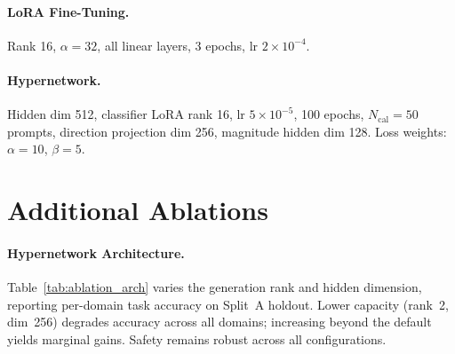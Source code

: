 \documentclass[11pt]{article}
\begin{document}
\paragraph{LoRA Fine-Tuning.} Rank 16, $\alpha{=}32$, all linear layers, 3 epochs, lr $2{\times}10^{-4}$.

\paragraph{Hypernetwork.} Hidden dim 512, classifier LoRA rank 16, lr $5{\times}10^{-5}$, 100 epochs, $N_\text{cal}{=}50$ prompts, direction projection dim 256, magnitude hidden dim 128. Loss weights: $\alpha{=}10$, $\beta{=}5$.

\section{Additional Ablations}
\label{app:ablations}

\paragraph{Hypernetwork Architecture.}
Table~\ref{tab:ablation_arch} varies the generation rank and hidden dimension, reporting per-domain task accuracy on Split~A holdout. Lower capacity (rank~2, dim~256) degrades accuracy across all domains; increasing beyond the default yields marginal gains. Safety remains robust across all configurations.

\begin{table}[h]
\centering
\small
{}
\caption{Architecture sensitivity (LLaMA-3, Split~A holdout). Lower capacity degrades accuracy; higher capacity gives marginal gains. Safety is robust across all configurations.}
\label{tab:ablation_arch}
\end{table}
\end{document}
